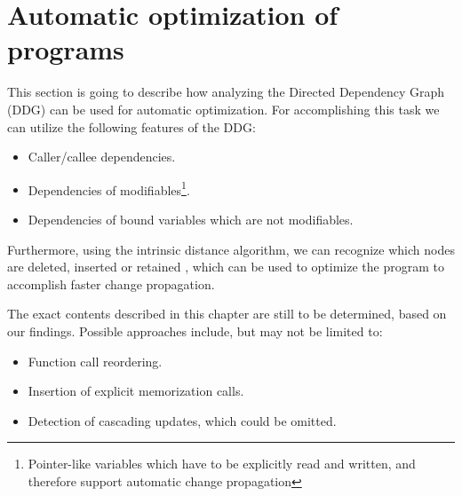 \section{Automatic optimization of programs}
This section is going to describe how analyzing the Directed Dependency Graph (DDG) can be used for automatic optimization. For accomplishing this task we can utilize the following features of the DDG: 
\begin{itemize}
\item Caller/callee dependencies. 
\item Dependencies of modifiables\footnote{Pointer-like variables which have to be explicitly read and written, and therefore support automatic change propagation}.
\item Dependencies of bound variables which are not modifiables. 
\end{itemize}

Furthermore, using the intrinsic distance algorithm, we can recognize which nodes are deleted, inserted or retained \cite{Acar2005thesis}, which can be used to optimize the program to accomplish faster change propagation. 

The exact contents described in this chapter are still to be determined, based on our findings. Possible approaches include, but may not be limited to: 

\begin{itemize}
\item Function call reordering. 
\item Insertion of explicit memorization calls.
\item Detection of cascading updates, which could be omitted. 
\end{itemize}